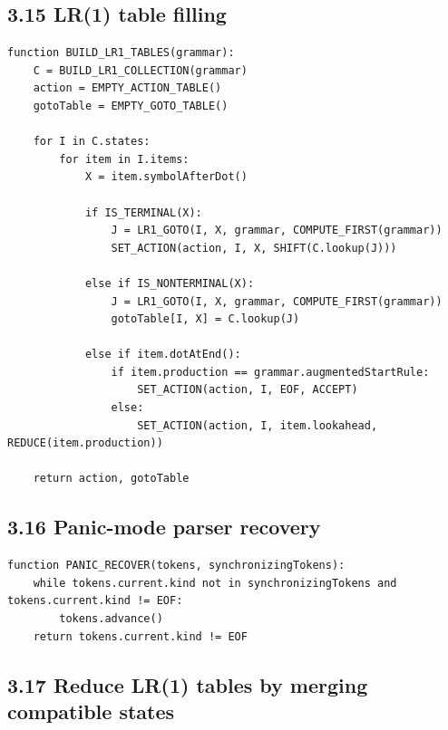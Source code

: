 \documentclass[10pt,letterpaper]{article}
\begin{document}
\subsection*{3.15 LR(1) table filling}
{}

\begin{verbatim}
function BUILD_LR1_TABLES(grammar):
    C = BUILD_LR1_COLLECTION(grammar)
    action = EMPTY_ACTION_TABLE()
    gotoTable = EMPTY_GOTO_TABLE()

    for I in C.states:
        for item in I.items:
            X = item.symbolAfterDot()

            if IS_TERMINAL(X):
                J = LR1_GOTO(I, X, grammar, COMPUTE_FIRST(grammar))
                SET_ACTION(action, I, X, SHIFT(C.lookup(J)))

            else if IS_NONTERMINAL(X):
                J = LR1_GOTO(I, X, grammar, COMPUTE_FIRST(grammar))
                gotoTable[I, X] = C.lookup(J)

            else if item.dotAtEnd():
                if item.production == grammar.augmentedStartRule:
                    SET_ACTION(action, I, EOF, ACCEPT)
                else:
                    SET_ACTION(action, I, item.lookahead, REDUCE(item.production))

    return action, gotoTable
\end{verbatim}

\subsection*{3.16 Panic-mode parser recovery}
{}

\begin{verbatim}
function PANIC_RECOVER(tokens, synchronizingTokens):
    while tokens.current.kind not in synchronizingTokens and tokens.current.kind != EOF:
        tokens.advance()
    return tokens.current.kind != EOF
\end{verbatim}

\subsection*{3.17 Reduce LR(1) tables by merging compatible states}
{}
\end{document}
